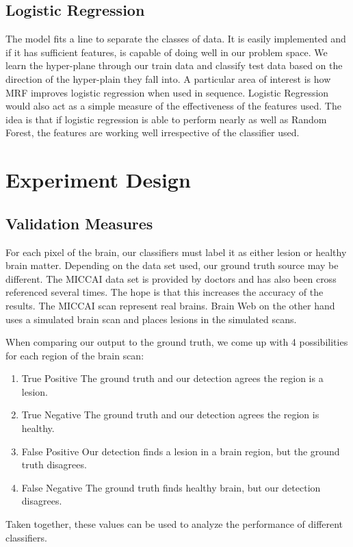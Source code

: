 \documentclass{article} %
\begin{document}
\subsection{Logistic Regression} 
The model fits a line to separate the classes of data. It is easily implemented and if it has sufficient features, is capable of doing well in our problem space. We learn the hyper-plane through our train data and classify test data based on the direction of the hyper-plain they fall into. A particular area of interest is how MRF improves logistic regression when used in sequence. Logistic Regression would also act as a simple measure of the effectiveness of the features used. The idea is that if logistic regression is able to perform nearly as well as Random Forest, the features are working well irrespective of the classifier used.  


\section{Experiment Design}

\subsection{Validation Measures}
For each pixel of the brain, our classifiers must label it as either lesion or healthy brain matter. Depending on the data set used, our ground truth source may be different. The MICCAI data set is provided by doctors and has also been cross referenced several times. The hope is that this increases the accuracy of the results. The MICCAI scan represent real brains. Brain Web on the other hand uses a simulated brain scan and places lesions in the simulated scans.

When comparing our output to the ground truth, we come up with 4 possibilities for each region of the brain scan:
\begin{enumerate}
  \item True Positive \newline
		The ground truth and our detection agrees the region is a lesion.
  \item True Negative \newline
  		The ground truth and our detection agrees the region is healthy.
  \item False Positive \newline
  		Our detection finds a lesion in a brain region, but the ground truth disagrees.
  \item False Negative \newline
  		The ground truth finds healthy brain, but our detection disagrees.
\end{enumerate} 
Taken together, these values can be used to analyze the performance of different classifiers. 
\end{document}
